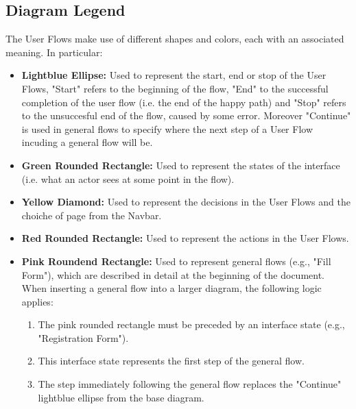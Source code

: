 \documentclass[12pt, a4paper]{article}
\begin{document}
\subsection{Diagram Legend}
The User Flows make use of different shapes and colors, each with an associated meaning. In particular:
\begin{itemize}
    \item \textbf{Lightblue Ellipse: }Used to represent the start, end or stop of the User Flows, "Start" refers to the beginning of the flow, "End" to the successful completion of the user flow (i.e. the end of the happy path) and "Stop" refers to the unsuccesful end of the flow, caused by some error. Moreover "Continue" is used in general flows to specify where the next step of a User Flow incuding a general flow will be.
    \item \textbf{Green Rounded Rectangle: }Used to represent the states of the interface (i.e. what an actor sees at some point in the flow).
    \item \textbf{Yellow Diamond: }Used to represent the decisions in the User Flows and the choiche of page from the Navbar.
    \item \textbf{Red Rounded Rectangle: }Used to represent the actions in the User Flows.
    \item \textbf{Pink Roundend Rectangle: }Used to represent general flows (e.g., "Fill Form"), which are described in detail at the beginning of the document. When inserting a general flow into a larger diagram, the following logic applies:
        \begin{enumerate}
            \item The pink rounded rectangle must be preceded by an interface state (e.g., "Registration Form").
            \item This interface state represents the first step of the general flow.
            \item The step immediately following the general flow replaces the "Continue" lightblue ellipse from the base diagram.
        \end{enumerate}
\end{itemize}

\newpage
{} 
\end{document}
